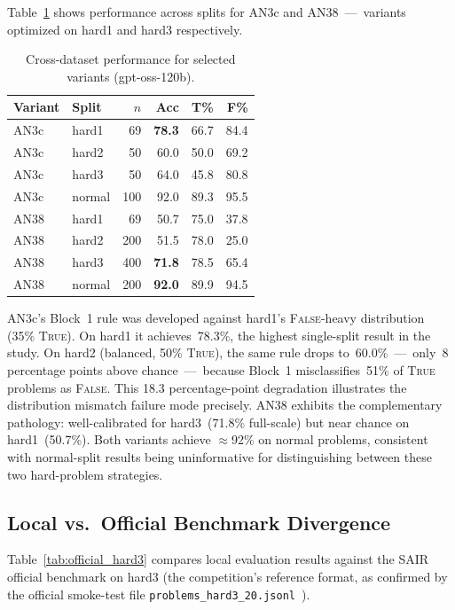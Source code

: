 \documentclass[11pt]{article}
\begin{document}
Table~\ref{tab:crossdataset} shows performance across splits for AN3c
and AN38~---~variants optimized on hard1 and hard3 respectively.

\begin{table}[h]
\centering
\caption{Cross-dataset performance for selected variants (gpt-oss-120b).}
\label{tab:crossdataset}
\begin{tabular}{llrrrr}
\toprule
Variant & Split & $n$ & Acc & T\% & F\% \\
\midrule
AN3c & hard1  & 69  & \textbf{78.3} & 66.7 & 84.4 \\
AN3c & hard2  & 50  & 60.0 & 50.0 & 69.2 \\
AN3c & hard3  & 50  & 64.0 & 45.8 & 80.8 \\
AN3c & normal & 100 & 92.0 & 89.3 & 95.5 \\
\midrule
AN38 & hard1  & 69  & 50.7 & 75.0 & 37.8 \\
AN38 & hard2  & 200 & 51.5 & 78.0 & 25.0 \\
AN38 & hard3  & 400 & \textbf{71.8} & 78.5 & 65.4 \\
AN38 & normal & 200 & \textbf{92.0} & 89.9 & 94.5 \\
\bottomrule
\end{tabular}
\end{table}

AN3c's Block~1 rule was developed against hard1's \textsc{False}-heavy
distribution (35\% \textsc{True}). On hard1 it achieves~78.3\%, the
highest single-split result in the study. On hard2 (balanced, 50\%
\textsc{True}), the same rule drops to~60.0\%~---~only~8 percentage
points above chance~---~because Block~1 misclassifies~51\% of
\textsc{True} problems as \textsc{False}. This 18.3 percentage-point
degradation illustrates the distribution mismatch failure mode
precisely. AN38 exhibits the complementary pathology: well-calibrated
for hard3~(71.8\% full-scale) but near chance on hard1~(50.7\%). Both
variants achieve $\approx$92\% on normal problems, consistent with
normal-split results being uninformative for distinguishing between these
two hard-problem strategies.

\subsection{Local vs.\ Official Benchmark Divergence}
\label{sec:local-official}

Table~\ref{tab:official_hard3} compares local evaluation results
against the SAIR official benchmark on hard3 (the competition's
reference format, as confirmed by the official smoke-test file
\texttt{problems\_hard3\_20.jsonl}~\citep{sair2026judge}).
\end{document}
